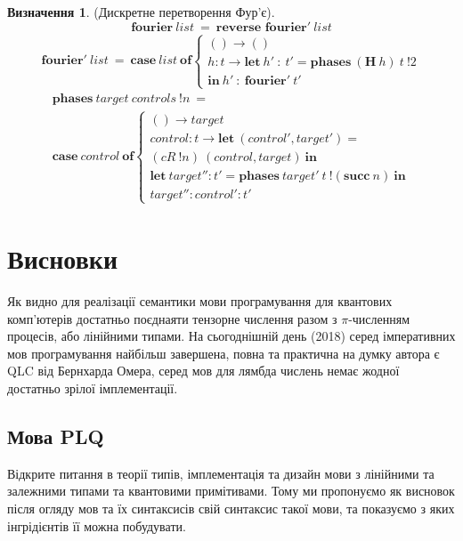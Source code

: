 \documentclass{article}
\theoremstyle{definition}
\newtheorem{definition}{Визначення}
\begin{document}
\begin{definition} (Дискретне перетворення Фур'є).
\begin{equation}
\textbf{fourier}\ list\ =\ \textbf{reverse fourier}'\ list
\end{equation}
\begin{multline}
\textbf{fourier}'\ list\ =
\ \textbf{case}\ list\ \textbf{of}
\begin{cases}
() \rightarrow () \\
h : t \rightarrow \textbf{let}\ h'\ :\ t' = \textbf{phases}\ (\textbf{H}\ h)\ t\ !2 \\
\textbf{in}\ h'\ :\ \textbf{fourier}'\ t'
\end{cases}
\end{multline}
\begin{multline}
\textbf{phases}\ target\ controls\ !n\ = \\
\textbf{case}\ control\ \textbf{of}
\begin{cases}
() \rightarrow target \\
control : t \rightarrow \textbf{let}\ (control',target') = \\
(cR\ !n)\ (control, target)\ \textbf{in} \\
\textbf{let}\ target'' : t' = \textbf{phases}\ target'\ t\ !(\textbf{succ}\ n)\ \textbf{in} \\
target '' : control' : t'
\end{cases}
\end{multline}
\end{definition}

\newpage
\section{Висновки}
Як видно для реалізації семантики мови програмування для квантових
комп'ютерів достатньо поєднаяти тензорне числення разом з $\pi$-численням процесів,
або лінійними типами. На сьогоднішній день (2018) серед імперативних мов програмування
найбільш завершена, повна та практична на думку автора є QLC від Бернхарда Омера, серед
мов для лямбда числень немає жодної достатньо зрілої імплементації.

\subsection{Мова PLQ}
Відкрите питання в теорії типів, імплементація та дизайн мови
з лінійними та залежними типами та квантовими примітивами.
Тому ми пропонуємо як висновок після огляду мов та їх синтаксисів свій синтаксис такої мови,
та показуємо з яких інгрідієнтів її можна побудувати.
\end{document}
